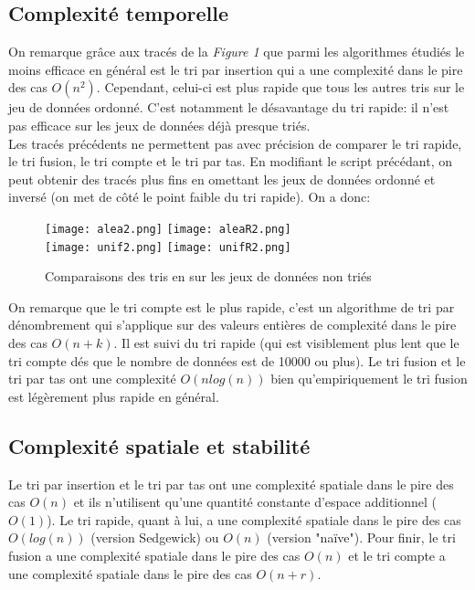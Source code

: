 \documentclass[12pt]{article}
\begin{document}
		\subsection{Complexité temporelle}
			On remarque grâce aux tracés de la \textit{Figure 1} que parmi les algorithmes étudiés le moins efficace en général est le tri par insertion qui a une complexité dans le pire des cas $O(n^2)$. Cependant, celui-ci est plus rapide que tous les autres tris sur le jeu de données ordonné. C'est notamment le désavantage du tri rapide: il n'est pas efficace sur les jeux de données déjà presque triés. \\
			
			Les tracés précédents ne permettent pas avec précision de comparer le tri rapide, le tri fusion, le tri compte et le tri par tas. En modifiant le script précédant, on peut obtenir des tracés plus fins en omettant les jeux de données ordonné et inversé (on met de côté le point faible du tri rapide). On a donc:
			\begin{figure}[hbt!]
				\centering
				\texttt{[image: alea2.png]}
				\texttt{[image: aleaR2.png]} \\
				\texttt{[image: unif2.png]}
				\texttt{[image: unifR2.png]} \\
				\caption{Comparaisons des tris en sur les jeux de données non triés}
			\end{figure}
			\justify \newpage
			
			On remarque que le tri compte est le plus rapide, c'est un algorithme de tri par dénombrement qui s'applique sur des valeurs entières de complexité dans le pire des cas $O(n + k)$. Il est suivi du tri rapide (qui est visiblement plus lent que le tri compte dés que le nombre de données est de 10000 ou plus). Le tri fusion et le tri par tas ont une complexité $O(nlog(n))$ bien  qu'empiriquement le tri fusion est légèrement plus rapide en général. 
			
		\subsection{Complexité spatiale et stabilité}
			Le tri par insertion et le tri par tas ont une complexité spatiale dans le pire des cas $O(n)$ et ils n'utilisent qu'une quantité constante d'espace additionnel ($O(1)$). Le tri rapide, quant à lui, a une complexité spatiale dans le pire des cas $O(log(n))$ (version Sedgewick) ou $O(n)$ (version "naïve"). Pour finir, le tri fusion a une complexité spatiale dans le pire des cas $O(n)$ et le tri compte a une complexité spatiale dans le pire des cas $O(n + r)$. \\
			
\end{document}
